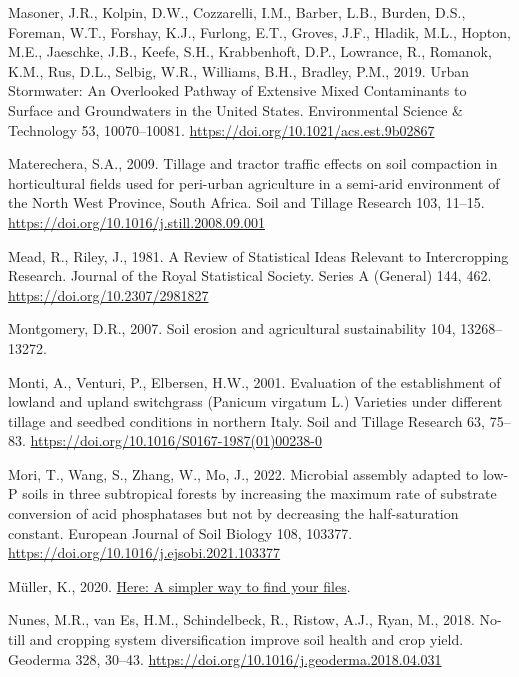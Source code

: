 \documentclass[
  12pt,
]{article}
\newlength{\cslhangindent}
\newlength{\cslentryspacingunit} %
\newenvironment{CSLReferences}[2] %
 {%
  \setlength{\parindent}{0pt}
  \ifodd #1
  \let\oldpar\par
  \def\par{\hangindent=\cslhangindent\oldpar}
  \fi
  \setlength{\parskip}{#2\cslentryspacingunit}
 }%
 {}
\begin{document}
\begin{CSLReferences}{1}{0}
\leavevmode{}%
Masoner, J.R., Kolpin, D.W., Cozzarelli, I.M., Barber, L.B., Burden, D.S., Foreman, W.T., Forshay, K.J., Furlong, E.T., Groves, J.F., Hladik, M.L., Hopton, M.E., Jaeschke, J.B., Keefe, S.H., Krabbenhoft, D.P., Lowrance, R., Romanok, K.M., Rus, D.L., Selbig, W.R., Williams, B.H., Bradley, P.M., 2019. Urban {Stormwater}: {An Overlooked Pathway} of {Extensive Mixed Contaminants} to {Surface} and {Groundwaters} in the {United States}. Environmental Science \& Technology 53, 10070--10081. \url{https://doi.org/10.1021/acs.est.9b02867}

\leavevmode{}%
Materechera, S.A., 2009. Tillage and tractor traffic effects on soil compaction in horticultural fields used for peri-urban agriculture in a semi-arid environment of the {North West Province}, {South Africa}. Soil and Tillage Research 103, 11--15. \url{https://doi.org/10.1016/j.still.2008.09.001}

\leavevmode{}%
Mead, R., Riley, J., 1981. A {Review} of {Statistical Ideas Relevant} to {Intercropping Research}. Journal of the Royal Statistical Society. Series A (General) 144, 462. \url{https://doi.org/10.2307/2981827}

\leavevmode{}%
Montgomery, D.R., 2007. Soil erosion and agricultural sustainability 104, 13268--13272.

\leavevmode{}%
Monti, A., Venturi, P., Elbersen, H.W., 2001. Evaluation of the establishment of lowland and upland switchgrass ({Panicum} virgatum {L}.) Varieties under different tillage and seedbed conditions in northern {Italy}. Soil and Tillage Research 63, 75--83. \url{https://doi.org/10.1016/S0167-1987(01)00238-0}

\leavevmode{}%
Mori, T., Wang, S., Zhang, W., Mo, J., 2022. Microbial assembly adapted to low-{P} soils in three subtropical forests by increasing the maximum rate of substrate conversion of acid phosphatases but not by decreasing the half-saturation constant. European Journal of Soil Biology 108, 103377. \url{https://doi.org/10.1016/j.ejsobi.2021.103377}

\leavevmode{}%
Müller, K., 2020. \href{https://CRAN.R-project.org/package=here}{Here: A simpler way to find your files}.

\leavevmode{}%
Nunes, M.R., van Es, H.M., Schindelbeck, R., Ristow, A.J., Ryan, M., 2018. No-till and cropping system diversification improve soil health and crop yield. Geoderma 328, 30--43. \url{https://doi.org/10.1016/j.geoderma.2018.04.031}


\end{CSLReferences}
\end{document}
